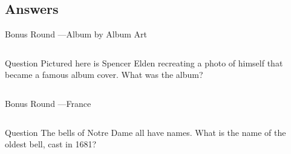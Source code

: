 \documentclass[11pt]{beamer}
\begin{document}
\subsection{Answers}
\begin{frame}[t]{Bonus Round ---Album by Album Art}
\begin{columns}[T,totalwidth=\linewidth]
\begin{column}{0.32\linewidth}
\begin{block}{Question}
Pictured here is Spencer Elden recreating a photo of himself that became a famous album cover. What was the album?
\end{block}
\end{column}
\begin{column}{0.65\linewidth}
\begin{center}
\texttt{[image: \{Images/nevermind]}.jpg}
\end{center}
\end{column}
\end{columns}
\end{frame}
\begin{frame}[t]{Bonus Round ---France}
\begin{columns}[T,totalwidth=\linewidth]
\begin{column}{0.32\linewidth}
\begin{block}{Question}
The bells of Notre Dame all have names.  What is the name of the oldest bell, cast in 1681?
\end{block}
\end{column}
\begin{column}{0.65\linewidth}
\begin{center}
\texttt{[image: \{Images/emannuelbell]}.jpg}
\end{center}
\end{column}
\end{columns}
\end{frame}
\end{document}
